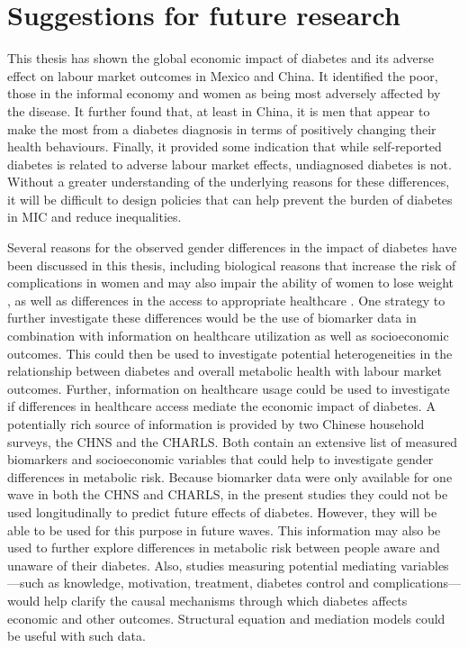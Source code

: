 \section{Suggestions for future research}

This thesis has shown the global economic impact of diabetes and its adverse effect on labour market outcomes in Mexico and China. It identified the poor, those in the informal economy and women as being most adversely affected by the disease. It further found that, at least in China, it is men that appear to make the most from a diabetes diagnosis in terms of positively changing their health behaviours. Finally, it provided some indication that while self-reported diabetes is related to adverse labour market effects, undiagnosed diabetes is not. Without a greater understanding of the underlying reasons for these differences, it will be difficult to design policies that can help prevent the burden of diabetes in \ac{MIC} and reduce inequalities.

Several reasons for the observed gender differences in the impact of diabetes have been discussed in this thesis, including biological reasons that increase the risk of complications in women \parencite{Peters2014,Peters2015,Arnetz2014,Roche2013,Policardo2014,Catalan2015,Engelmann2016,Seghieri2015} and may also impair the ability of women to lose weight \parencite{Penno2013}, as well as differences in the access to appropriate healthcare \parencite{Penno2013}. One strategy to further investigate these differences would be the use of biomarker data in combination with information on healthcare utilization as well as socioeconomic outcomes. This could then be used to investigate potential heterogeneities in the relationship between diabetes and overall metabolic health with labour market outcomes. Further, information on healthcare usage could be used to investigate if differences in healthcare access mediate the economic impact of diabetes. A potentially rich source of information is provided by two Chinese household surveys, the \acf{CHNS} and the \acf{CHARLS}. Both contain an extensive list of measured biomarkers and socioeconomic variables that could help to investigate gender differences in metabolic risk. Because biomarker data were only available for one wave in both the \ac{CHNS} and \ac{CHARLS}, in the present studies they could not be used longitudinally to predict future effects of diabetes. However, they will be able to be used for this purpose in future waves. This information may also be used to further explore differences in metabolic risk between people aware and unaware of their diabetes. Also, studies measuring potential mediating variables---such as knowledge, motivation, treatment, diabetes control and complications---would help clarify the causal mechanisms through which diabetes affects economic and other outcomes. Structural equation and mediation models could be useful with such data. 

